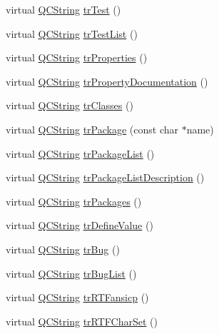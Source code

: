 \begin{DoxyCompactItemize}
virtual \hyperlink{class_q_c_string}{Q\+C\+String} \hyperlink{class_translator_serbian_cyrillic_abcd9eac8a07dc71bc67d75504e5f5fba}{tr\+Test} ()
\item 
virtual \hyperlink{class_q_c_string}{Q\+C\+String} \hyperlink{class_translator_serbian_cyrillic_aba8a9441f333d4b798e1792422d22b87}{tr\+Test\+List} ()
\item 
virtual \hyperlink{class_q_c_string}{Q\+C\+String} \hyperlink{class_translator_serbian_cyrillic_a073934ac0520cbecf6cf0dc65b19deb5}{tr\+Properties} ()
\item 
virtual \hyperlink{class_q_c_string}{Q\+C\+String} \hyperlink{class_translator_serbian_cyrillic_a27657957f2abf25e3d531c088c11f17d}{tr\+Property\+Documentation} ()
\item 
virtual \hyperlink{class_q_c_string}{Q\+C\+String} \hyperlink{class_translator_serbian_cyrillic_a138724316b15f8bb0761d74ef5992170}{tr\+Classes} ()
\item 
virtual \hyperlink{class_q_c_string}{Q\+C\+String} \hyperlink{class_translator_serbian_cyrillic_ae0960b5ad5aef701e94ee70f73bf24da}{tr\+Package} (const char $\ast$name)
\item 
virtual \hyperlink{class_q_c_string}{Q\+C\+String} \hyperlink{class_translator_serbian_cyrillic_a53c68048671e1ca513b441a7ee226021}{tr\+Package\+List} ()
\item 
virtual \hyperlink{class_q_c_string}{Q\+C\+String} \hyperlink{class_translator_serbian_cyrillic_a46b303143151f097f16f9dbf6670ae32}{tr\+Package\+List\+Description} ()
\item 
virtual \hyperlink{class_q_c_string}{Q\+C\+String} \hyperlink{class_translator_serbian_cyrillic_aff13357770145a573d7c64d7601ae643}{tr\+Packages} ()
\item 
virtual \hyperlink{class_q_c_string}{Q\+C\+String} \hyperlink{class_translator_serbian_cyrillic_ae924f00ec68192ba76889b26257f19b5}{tr\+Define\+Value} ()
\item 
virtual \hyperlink{class_q_c_string}{Q\+C\+String} \hyperlink{class_translator_serbian_cyrillic_aedd32ebb978bed3d6df4f2a9a0ddf659}{tr\+Bug} ()
\item 
virtual \hyperlink{class_q_c_string}{Q\+C\+String} \hyperlink{class_translator_serbian_cyrillic_a75182d535aa97bc820e764a5cec03509}{tr\+Bug\+List} ()
\item 
virtual \hyperlink{class_q_c_string}{Q\+C\+String} \hyperlink{class_translator_serbian_cyrillic_a6dcfdb3f544c2e1e32673d81c088b9e3}{tr\+R\+T\+Fansicp} ()
\item 
virtual \hyperlink{class_q_c_string}{Q\+C\+String} \hyperlink{class_translator_serbian_cyrillic_a56d543bd8cb47b0e1a08df7774bbea22}{tr\+R\+T\+F\+Char\+Set} ()

\end{DoxyCompactItemize}
